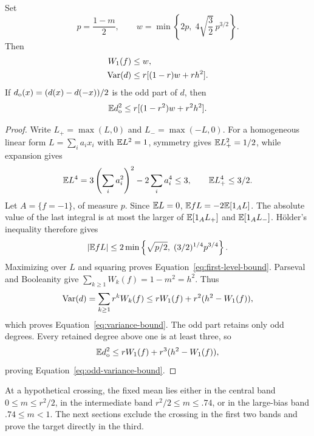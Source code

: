 \begin{lemma}\label{lem:fourier-bounds}
Set
\[
p=\frac{1-m}{2},\qquad
w=\min\left\{2p,\;4\sqrt{\frac32}\,p^{3/2}\right\}.
\]
Then
\begin{align}
W_1(f)&\le w,\label{eq:first-level-bound}\\
\operatorname{Var}(d)&\le r[(1-r)w+rh^2].\label{eq:variance-bound}
\end{align}
If \(d_{\rm o}(x)=(d(x)-d(-x))/2\) is the odd part of \(d\), then
\begin{equation}\label{eq:odd-variance-bound}
\mathbb E d_{\rm o}^2\le r[(1-r^2)w+r^2h^2].
\end{equation}
\end{lemma}
\begin{proof}
Write \(L_+=\max(L,0)\) and \(L_-=\max(-L,0)\).
For a homogeneous linear form \(L=\sum_i a_i x_i\) with \(\mathbb E L^2=1\), symmetry gives
\(\mathbb E L_+^2=1/2\), while expansion gives
\[
\mathbb E L^4=3\left(\sum_i a_i^2\right)^2-2\sum_i a_i^4\le3,
\qquad \mathbb E L_+^4\le3/2.
\]
Let \(A=\{f=-1\}\), of measure \(p\).
Since \(\mathbb E L=0\),
\(\mathbb E fL=-2\mathbb E[1_A L]\).
The absolute value of the last integral is at most the larger of
\(\mathbb E[1_A L_+]\) and \(\mathbb E[1_A L_-]\).
Hölder's inequality therefore gives
\[
|\mathbb E fL|\le
2\min\left\{\sqrt{p/2},\;(3/2)^{1/4}p^{3/4}\right\}.
\]
Maximizing over \(L\) and squaring proves Equation~\eqref{eq:first-level-bound}.
Parseval and Booleanity give
\(\sum_{k\ge1}W_k(f)=1-m^2=h^2\).
Thus
\[
\operatorname{Var}(d)=\sum_{k\ge1}r^kW_k(f)
\le rW_1(f)+r^2(h^2-W_1(f)),
\]
which proves Equation~\eqref{eq:variance-bound}.
The odd part retains only odd degrees. Every retained degree above one is at least three, so
\[
\mathbb E d_{\rm o}^2
\le rW_1(f)+r^3(h^2-W_1(f)),
\]
proving Equation~\eqref{eq:odd-variance-bound}.
\end{proof}

At a hypothetical crossing, the fixed mean lies either in the central band
\(0\le m\le r^2/2\), in the intermediate band \(r^2/2\le m\le .74\), or in the large-bias band \(.74\le m<1\).
The next sections exclude the crossing in the first two bands and prove the target directly in the third.
